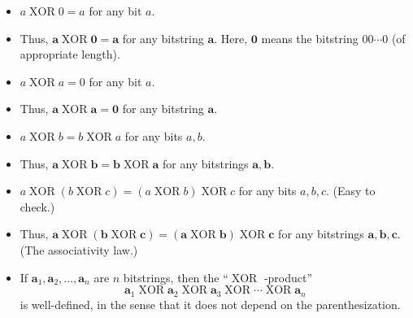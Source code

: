 \documentclass[numbers=enddot,12pt,final,onecolumn,notitlepage]{scrartcl}%
\numberwithin{exer}{section}
\theoremstyle{definition}
\begin{document}
\begin{itemize}
\item $a\operatorname*{XOR}0=a$ for any bit $a$.

\item Thus, $\mathbf{a}\operatorname*{XOR}\mathbf{0}=\mathbf{a}$ for any
bitstring $\mathbf{a}$. Here, $\mathbf{0}$ means the bitstring $00\cdots0$ (of
appropriate length).

\item $a\operatorname*{XOR}a=0$ for any bit $a$.

\item Thus, $\mathbf{a}\operatorname*{XOR}\mathbf{a}=\mathbf{0}$ for any
bitstring $\mathbf{a}$.

\item $a\operatorname*{XOR}b=b\operatorname*{XOR}a$ for any bits $a,b$.

\item Thus, $\mathbf{a}\operatorname*{XOR}\mathbf{b}=\mathbf{b}%
\operatorname*{XOR}\mathbf{a}$ for any bitstrings $\mathbf{a},\mathbf{b}$.

\item $a\operatorname*{XOR}\left(  b\operatorname*{XOR}c\right)  =\left(
a\operatorname*{XOR}b\right)  \operatorname*{XOR}c$ for any bits $a,b,c$.
(Easy to check.)

\item Thus, $\mathbf{a}\operatorname*{XOR}\left(  \mathbf{b}%
\operatorname*{XOR}\mathbf{c}\right)  =\left(  \mathbf{a}\operatorname*{XOR}%
\mathbf{b}\right)  \operatorname*{XOR}\mathbf{c}$ for any bitstrings
$\mathbf{a},\mathbf{b},\mathbf{c}$. (The associativity law.)

\item If $\mathbf{a}_{1},\mathbf{a}_{2},\ldots,\mathbf{a}_{n}$ are $n$
bitstrings, then the \textquotedblleft$\operatorname*{XOR}$%
-product\textquotedblright%
\[
\mathbf{a}_{1}\operatorname*{XOR}\mathbf{a}_{2}\operatorname*{XOR}%
\mathbf{a}_{3}\operatorname*{XOR}\cdots\operatorname*{XOR}\mathbf{a}_{n}%
\]
is well-defined, in the sense that it does not depend on the parenthesization.


\end{itemize}
\end{document}
